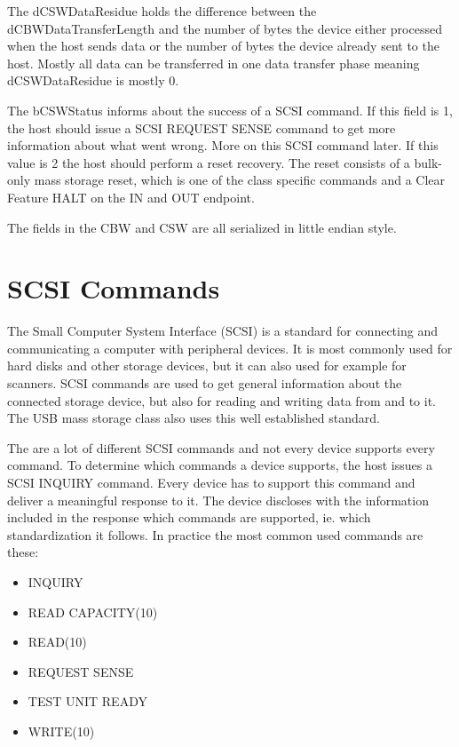The dCSWDataResidue holds the difference between the dCBWDataTransferLength and the number of bytes the device either processed when the host sends data or the number of bytes the device already sent to the host. Mostly all data can be transferred in one data transfer phase meaning dCSWDataResidue is mostly 0.

The bCSWStatus informs about the success of a SCSI command. If this field is 1, the host should issue a SCSI REQUEST SENSE command to get more information about what went wrong\cite{usb_ms_jan}. More on this SCSI command later. If this value is 2 the host should perform a reset recovery. The reset consists of a bulk-only mass storage reset, which is one of the class specific commands and a Clear Feature HALT on the IN and OUT endpoint\cite{usb_ms_jan, usb_mass_bulk}.

The fields in the CBW and CSW are all serialized in little endian style.

\section{SCSI Commands}

The Small Computer System Interface (SCSI) is a standard for connecting and communicating a computer with peripheral devices. It is most commonly used for hard disks and other storage devices, but it can also used for example for scanners\cite{wiki_scsi}. SCSI commands are used to get general information about the connected storage device, but also for reading and writing data from and to it. The USB mass storage class also uses this well established standard.

The are a lot of different SCSI commands and not every device supports every command. To determine which commands a device supports, the host issues a SCSI INQUIRY command. Every device has to support this command and deliver a meaningful response to it. The device discloses with the information included in the response which commands are supported, ie. which standardization it follows. In practice the most common used commands are these\cite{usb_ms_jan}:

\begin{itemize}
\item INQUIRY
\item READ CAPACITY(10)
\item READ(10)
\item REQUEST SENSE
\item TEST UNIT READY
\item WRITE(10)
\end{itemize}

